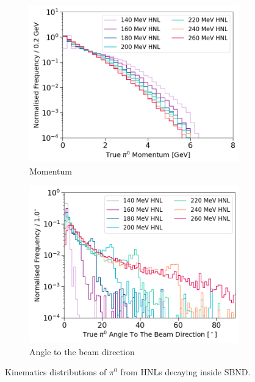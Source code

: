\begin{figure}[ht!]
        \centering
        \begin{subfigure}[b]{0.495\textwidth}
            \centering
            \includegraphics[width=\textwidth]{pi0_energy}
            \caption{Momentum}%
        \end{subfigure}
        \hfill
        \begin{subfigure}[b]{0.495\textwidth}  
            \centering 
            \includegraphics[width=\textwidth]{pi0_angle2Beam}
            \caption{Angle to the beam direction}%
        \end{subfigure}
        \caption[Kinematics Distributions of Neutral Pions From HNLs]{Kinematics distributions of $\pi^0$ from HNLs decaying inside SBND.}
        \label{fig:pi0_distribution}
\end{figure}


